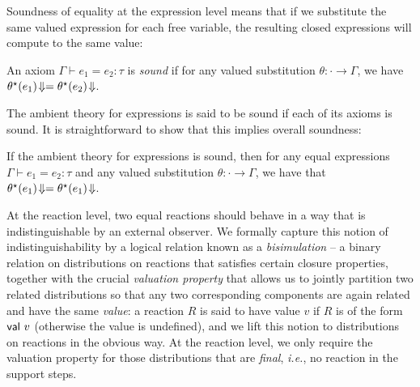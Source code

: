 Soundness of equality at the expression level means that if we substitute the same valued expression for each free variable, the resulting closed expressions will compute to the same value:

\begin{definition}
An axiom $\Gamma \vdash e_1 = e_2 : \tau$ is \emph{sound} if for any valued substitution $\theta : \cdot \to \Gamma$, we have $\theta^\star(e_1) \! \Downarrow = \theta^\star(e_2) \! \Downarrow$.
\end{definition}

\noindent The ambient \ipdl theory for expressions is said to be sound if each of its axioms is sound. It is straightforward to show that this implies overall soundness:
 
\begin{lemma}
If the ambient \ipdl theory for expressions is sound, then for any equal expressions $\Gamma \vdash e_1 = e_2 : \tau$ and any valued substitution $\theta : \cdot \to \Gamma$, we have that $\theta^\star(e_1) \! \Downarrow = \theta^\star(e_1) \! \Downarrow$.
\end{lemma}

At the reaction level, two equal reactions should behave in a way that is indistinguishable by an external observer. We formally capture this notion of indistinguishability by a logical relation known as a \emph{bisimulation} -- a binary relation on distributions on reactions that satisfies certain closure properties, together with the crucial \emph{valuation property} that allows us to jointly partition two related distributions so that any two corresponding components are again related and have the same \emph{value}: a reaction $R$ is said to have value $v$ if $R$ is of the form $\mathsf{val} \ v$ (otherwise the value is undefined), and we lift this notion to distributions on reactions in the obvious way. At the reaction level, we only require the valuation property for those distributions that are \emph{final}, \emph{i.e.}, no reaction in the support steps.

